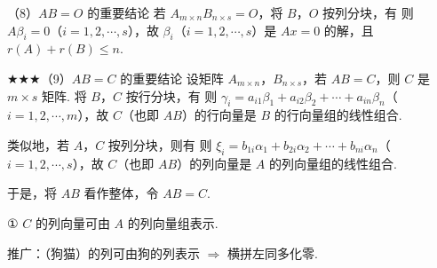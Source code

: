 \begin{fcard}{（8）$AB=O$ 的重要结论}
若 $A_{m\times n}B_{n\times s}=O$，将 $B$，$O$ 按列分块，有
则 $A\beta_i=0$（$i=1,2,\cdots,s$），故 $\beta_i$（$i=1,2,\cdots,s$）是 $Ax=0$ 的解，且 $r(A)+r(B)\leqslant n$.
\end{fcard}

\begin{fcard}{★★★（9）$AB=C$ 的重要结论}
设矩阵 $A_{m\times n}$，$B_{n\times s}$，若 $AB=C$，则 $C$ 是 $m\times s$ 矩阵. 将 $B$，$C$ 按行分块，有
则 $\gamma_i=a_{i1}\beta_1+a_{i2}\beta_2+\cdots+a_{in}\beta_n$（$i=1,2,\cdots,m$），故 $C$（也即 $AB$）的行向量是 $B$ 的行向量组的线性组合.

类似地，若 $A$，$C$ 按列分块，则有
则 $\xi_i=b_{1i}\alpha_1+b_{2i}\alpha_2+\cdots+b_{ni}\alpha_n$（$i=1,2,\cdots,s$），故 $C$（也即 $AB$）的列向量是 $A$ 的列向量组的线性组合.

于是，将 $AB$ 看作整体，令 $AB=C$.

① $C$ 的列向量可由 $A$ 的列向量组表示.

推广：（狗猫）的列可由狗的列表示 $\Rightarrow$ 横拼左同多化零.
\fml{[AB,A]\to[O,A],\quad [A,AB]\to[A,O],}


\end{fcard}
